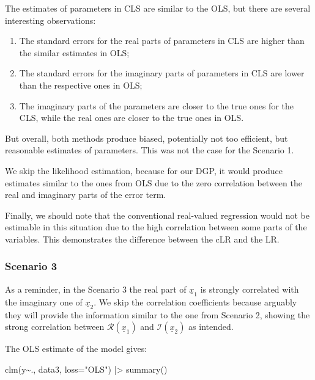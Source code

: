 \documentclass[
]{book}
\newenvironment{Shaded}{\begin{snugshade}}{\end{snugshade}}
\newcommand{\AttributeTok}[1]{\textcolor[rgb]{0.77,0.63,0.00}{#1}}
\newcommand{\FunctionTok}[1]{\textcolor[rgb]{0.00,0.00,0.00}{#1}}
\newcommand{\NormalTok}[1]{#1}
\newcommand{\SpecialCharTok}[1]{\textcolor[rgb]{0.00,0.00,0.00}{#1}}
\newcommand{\StringTok}[1]{\textcolor[rgb]{0.31,0.60,0.02}{#1}}
\providecommand{\tightlist}{%
  \setlength{\itemsep}{0pt}\setlength{\parskip}{0pt}}
\begin{document}
The estimates of parameters in CLS are similar to the OLS, but there are several interesting observations:

\begin{enumerate}
\def\labelenumi{\arabic{enumi}.}
\tightlist
\item
  The standard errors for the real parts of parameters in CLS are higher than the similar estimates in OLS;
\item
  The standard errors for the imaginary parts of parameters in CLS are lower than the respective ones in OLS;
\item
  The imaginary parts of the parameters are closer to the true ones for the CLS, while the real ones are closer to the true ones in OLS.
\end{enumerate}

But overall, both methods produce biased, potentially not too efficient, but reasonable estimates of parameters. This was not the case for the Scenario 1.

We skip the likelihood estimation, because for our DGP, it would produce estimates similar to the ones from OLS due to the zero correlation between the real and imaginary parts of the error term.

Finally, we should note that the conventional real-valued regression would not be estimable in this situation due to the high correlation between some parts of the variables. This demonstrates the difference between the cLR and the LR.

\hypertarget{scenario-3}{%
\subsubsection*{Scenario 3}\label{scenario-3}}

As a reminder, in the Scenario 3 the real part of \(\underline{x}_{1}\) is strongly correlated with the imaginary one of \(\underline{x}_{2}\). We skip the correlation coefficients because arguably they will provide the information similar to the one from Scenario 2, showing the strong correlation between \(\mathcal{R}\left(\underline{x}_{1}\right)\) and \(\mathcal{I}\left(\underline{x}_{2}\right)\) as intended.

The OLS estimate of the model gives:

\begin{Shaded}
\begin{Highlighting}[]
\FunctionTok{clm}\NormalTok{(y}\SpecialCharTok{\textasciitilde{}}\NormalTok{., data3, }\AttributeTok{loss=}\StringTok{"OLS"}\NormalTok{) }\SpecialCharTok{|\textgreater{}}
    \FunctionTok{summary}\NormalTok{()}
\end{Highlighting}
\end{Shaded}
\end{document}
